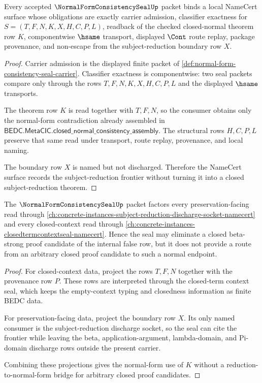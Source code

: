 \begin{theorem}
\label{thm:normal-form-consistency-seal-obligations}
Every accepted $\NormalFormConsistencySealUp$ packet binds a local NameCert
surface whose obligations are exactly carrier admission, classifier exactness
for $S=(T,F,N,K,X,H,C,P,L)$, readback of the checked closed-normal theorem row
$K$, componentwise $\hsame$ transport, displayed $\Cont$ route replay, package
provenance, and non-escape from the subject-reduction boundary row $X$.
\end{theorem}
\begin{proof}
Carrier admission is the displayed finite packet of
\autoref{def:normal-form-consistency-seal-carrier}. Classifier exactness is
componentwise: two seal packets compare only through the rows
$T,F,N,K,X,H,C,P,L$ and the displayed $\hsame$ transports.

The theorem row $K$ is read together with $T,F,N$, so the consumer obtains only
the normal-form contradiction already assembled in
$\mathsf{BEDC.MetaCIC.closed\_normal\_consistency\_assembly}$. The structural
rows $H,C,P,L$ preserve that same read under transport, route replay,
provenance, and local naming.

The boundary row $X$ is named but not discharged. Therefore the NameCert surface
records the subject-reduction frontier without turning it into a closed
subject-reduction theorem.
\end{proof}

\begin{theorem}
\label{thm:normal-form-consistency-seal-subject-reduction-boundary}
The $\NormalFormConsistencySealUp$ packet factors every preservation-facing read
through \autoref{ch:concrete-instances-subject-reduction-discharge-socket-namecert}
and every closed-context read through
\autoref{ch:concrete-instances-closedtermcontextseal-namecert}. Hence the seal
may eliminate a closed beta-strong proof candidate of the internal false row,
but it does not provide a route from an arbitrary closed proof candidate to such
a normal endpoint.
\end{theorem}
\begin{proof}
For closed-context data, project the rows $T,F,N$ together with the provenance
row $P$. These rows are interpreted through the closed-term context seal, which
keeps the empty-context typing and closedness information as finite BEDC data.

For preservation-facing data, project the boundary row $X$. Its only named
consumer is the subject-reduction discharge socket, so the seal can cite the
frontier while leaving the beta, application-argument, lambda-domain, and
Pi-domain discharge rows outside the present carrier.

Combining these projections gives the normal-form use of $K$ without a
reduction-to-normal-form bridge for arbitrary closed proof candidates.
\end{proof}

